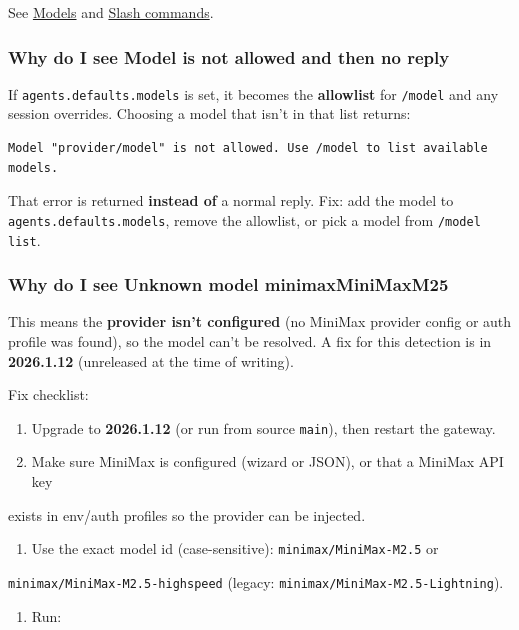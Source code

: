 See \href{/concepts/models}{Models} and \href{/tools/slash-commands}{Slash commands}.

\subsubsection{Why do I see Model is not allowed and then no reply}


If \texttt{agents.defaults.models} is set, it becomes the \textbf{allowlist} for \texttt{/model} and any
session overrides. Choosing a model that isn't in that list returns:

\begin{lstlisting}
Model "provider/model" is not allowed. Use /model to list available models.
\end{lstlisting}


That error is returned \textbf{instead of} a normal reply. Fix: add the model to
\texttt{agents.defaults.models}, remove the allowlist, or pick a model from \texttt{/model list}.

\subsubsection{Why do I see Unknown model minimaxMiniMaxM25}


This means the \textbf{provider isn't configured} (no MiniMax provider config or auth
profile was found), so the model can't be resolved. A fix for this detection is
in \textbf{2026.1.12} (unreleased at the time of writing).

Fix checklist:

\begin{enumerate}
  \item Upgrade to \textbf{2026.1.12} (or run from source \texttt{main}), then restart the gateway.
  \item Make sure MiniMax is configured (wizard or JSON), or that a MiniMax API key
\end{enumerate}

exists in env/auth profiles so the provider can be injected.
\begin{enumerate}
  \item Use the exact model id (case-sensitive): \texttt{minimax/MiniMax-M2.5} or
\end{enumerate}

\texttt{minimax/MiniMax-M2.5-highspeed} (legacy: \texttt{minimax/MiniMax-M2.5-Lightning}).
\begin{enumerate}
  \item Run:
\end{enumerate}



